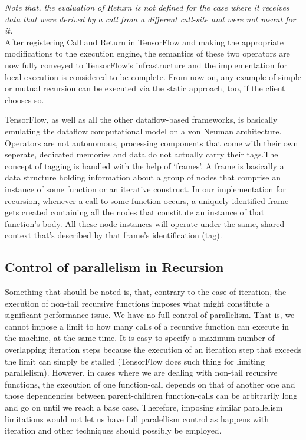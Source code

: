 \documentclass[ack,preface]{dithesis}
\begin{document}
\textit{Note that, the evaluation of Return is not defined for the case where it receives data that were derived by a call from a different call-site and were not meant for it.}\\

After registering Call and Return in TensorFlow and making the appropriate modifications to the execution engine, the semantics of these two operators are now fully conveyed to TensorFlow's infrastructure and the implementation for local execution is considered to be complete. From now on, any example of simple or mutual recursion can be executed via the static approach, too, if the client chooses so.


TensorFlow, as well as all the other dataflow-based frameworks, is basically emulating the dataflow computational model on a von Neuman architecture. Operators are not autonomous, processing components that come with their own seperate, dedicated memories and data do not actually carry their tags.The concept of tagging is handled with the help of \lq frames\rq .
A frame is basically a data structure holding information about a group of nodes that comprise an instance of some function or an iterative construct.
In our implementation for recursion, whenever a call to some function occurs, a uniquely identified frame gets created containing all the nodes that constitute an instance of that function's body. All these node-instances will operate under the same, shared context that's described by that frame's identification (tag).


    \subsection{Control of parallelism in Recursion}
Something that should be noted is, that, contrary to the case of iteration, the execution of non-tail recursive functions imposes what might constitute a significant performance issue.
We have no full control of parallelism. That is, we cannot impose a limit to how many calls of a recursive function can execute in the machine, at the same time.
Ιt is easy to specify a maximum number of overlapping iteration steps  because the execution of an iteration step that exceeds the limit can simply be stalled (TensorFlow does such thing for limiting parallelism). However, in cases where we are dealing with non-tail recursive functions, the execution of one function-call depends on that of another one and those dependencies between parent-children function-calls can be arbitrarily long and go on until we reach a base case. Therefore, imposing similar parallelism limitations would not let us have full paralellism control as happens with iteration and other techniques should possibly be employed.
\end{document}

